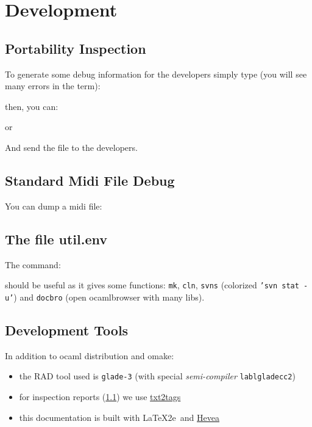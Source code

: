 \section{Development}

\subsection{Portability Inspection}
\label{sec:inspect}

To generate some debug information for the developers simply type (you will see
many errors in the term):


then, you can:


or


And send the file  to the developers.

\subsection{Standard Midi File Debug}
You can dump a midi file:


\subsection{The file util.env}
The command:


should be useful as it gives some functions:
\texttt{mk}, \texttt{cln}, \texttt{svns} (colorized \texttt{'svn stat -u'}) and
\texttt{docbro} (open ocamlbrowser with many libs).

\subsection{Development Tools}

In addition to ocaml distribution and omake:

\begin{itemize}
  \item the RAD tool used is \texttt{glade-3} (with special
  \textit{semi-compiler} \texttt{lablgladecc2})
  \item for inspection reports (\ref{sec:inspect}) we use
  \href{http://txt2tags.sourceforge.net/}{txt2tags}
  \item this documentation is built with \LaTeX2e\ and 
  \href{http://hevea.inria.fr/}{Hevea}
\end{itemize}

